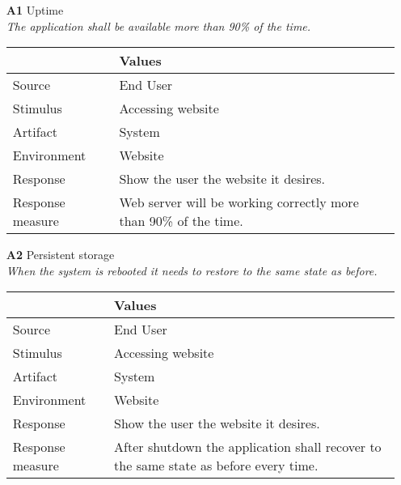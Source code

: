 \begin{itemize}
    \item[\textbf{A1}] Uptime \\
    \textit{\small{The application shall be available more than 90\% of the time.}}
        
    \begin{tabular}{| l | p{7cm} |}
        \hline
        \rowcolor[gray]{0.8}
        \textbf{} & \textbf{Values} \\
        \hline
        Source & End User \\
        Stimulus & Accessing website \\
        Artifact & System \\
        Environment & Website \\
        Response & Show the user the website it desires. \\
        Response measure & Web server will be working correctly more than 90\% of the time. \\
        \hline
    \end{tabular}

    \item[\textbf{A2}] Persistent storage \\
    \textit{\small{When the system is rebooted it needs to restore to the same state as before.}}
        
    \begin{tabular}{| l | p{7cm} |}
        \hline
        \rowcolor[gray]{0.8}
        \textbf{} & \textbf{Values} \\
        \hline
        Source & End User \\
        Stimulus & Accessing website \\
        Artifact & System \\
        Environment & Website \\
        Response & Show the user the website it desires. \\
        Response measure & After shutdown the application shall recover to the same state as before every time. \\
        \hline
    \end{tabular}
\end{itemize}

